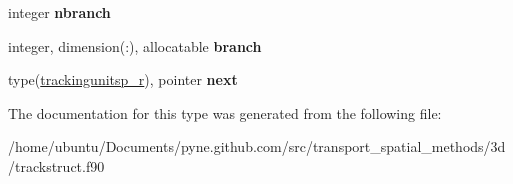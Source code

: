 \begin{DoxyCompactItemize}
\item 
integer {\bfseries nbranch}\hypertarget{structtracking__data__structures_1_1trackingunitsp__r_a5378c801096551d6d507eb04dd011a6c}{}\label{structtracking__data__structures_1_1trackingunitsp__r_a5378c801096551d6d507eb04dd011a6c}

\item 
integer, dimension(\+:), allocatable {\bfseries branch}\hypertarget{structtracking__data__structures_1_1trackingunitsp__r_a190f4625d2f13828b2f02ca184121c79}{}\label{structtracking__data__structures_1_1trackingunitsp__r_a190f4625d2f13828b2f02ca184121c79}

\item 
type(\hyperlink{structtracking__data__structures_1_1trackingunitsp__r}{trackingunitsp\+\_\+r}), pointer {\bfseries next}\hypertarget{structtracking__data__structures_1_1trackingunitsp__r_a24d8fb2d7521637baa6381200f4fd753}{}\label{structtracking__data__structures_1_1trackingunitsp__r_a24d8fb2d7521637baa6381200f4fd753}

\end{DoxyCompactItemize}


The documentation for this type was generated from the following file\+:\begin{DoxyCompactItemize}
\item 
/home/ubuntu/\+Documents/pyne.\+github.\+com/src/transport\+\_\+spatial\+\_\+methods/3d/trackstruct.\+f90\end{DoxyCompactItemize}
